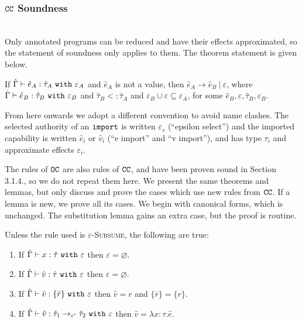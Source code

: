 \subsubsection{$\mathtt{CC}$ Soundness} ~\\

Only annotated programs can be reduced and have their effects approximated, so the statement of soundness only applies to them. The theorem statement is given below.

\begin{theorem}
If $\hat \Gamma \vdash \hat e_A: \hat \tau_A~\mathtt{with}~ \varepsilon_A$ and $\hat e_A$ is not a value, then $\hat e_A \longrightarrow \hat e_B~|~\varepsilon$, where $\hat \Gamma \vdash \hat e_B: \hat \tau_B~\mathtt{with}~ \varepsilon_B$ and $\hat \tau_B <: \hat \tau_A$ and $\varepsilon_B \cup \varepsilon \subseteq \varepsilon_A$, for some $\hat e_B, \varepsilon, \hat \tau_B, \varepsilon_B$.
\end{theorem}

From here onwards we adopt a different convention to avoid name clashes. The selected authority of an $\mathtt{import}$ is written $\varepsilon_{s}$ (``epsilon select'') and the imported capability is written $\hat e_i$ or $\hat v_i$ (``e import'' and ``v import''), and has type $\tau_i$ and approximate effects $\varepsilon_i$.

The rules of $\mathtt{OC}$ are also rules of $\mathtt{CC}$, and have been proven sound in Section 3.1.4., so we do not repeat them here. We present the same theorems and lemmas, but only discuss and prove the cases which use new rules from $\mathtt{CC}$. If a lemma is new, we prove all its cases. We begin with canonical forms, which is unchanged. The substitution lemma gains an extra case, but the proof is routine.

\begin{lemma}
Unless the rule used is \textsc{$\varepsilon$-Subsume}, the following are true:
\begin{enumerate}
	\setlength\itemsep{-0.2em}
	\item If $\hat \Gamma \vdash x: \hat \tau~\mathtt{with}~ \varepsilon$ then $\varepsilon = \varnothing$.
	\item If $\hat \Gamma \vdash \hat v: \hat \tau~\mathtt{with}~ \varepsilon$ then $\varepsilon = \varnothing$.
	\item If $\hat \Gamma \vdash \hat v: \{ \bar r \}~\mathtt{with}~ \varepsilon$ then $\hat v = r$ and $\{ \bar r \} = \{ r \}$.
	\item If $\hat \Gamma \vdash \hat v: \hat \tau_1 \rightarrow_{\varepsilon'} \hat \tau_2~\mathtt{with}~ \varepsilon$ then $\hat v = \lambda x:\tau. \hat e$.
\end{enumerate}
\end{lemma}

